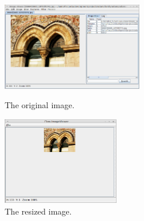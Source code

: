 \documentclass[a4paper]{book}
\begin{document}
\begin{figure}[htb]
  \begin{minipage}[b]{0.48\linewidth}
  \centering
  \includegraphics[height=3.8cm]{images/imagemagick-resize-original.png}
  \caption{The original image.}
  \label{imagemagick-resize-original}
  \end{minipage}%
  \begin{minipage}[b]{0.48\linewidth}
  \centering
  \includegraphics[height=3.8cm]{images/imagemagick-resize-output.png}
  \caption{The resized image.}
  \label{imagemagick-resize-output}
  \end{minipage}
\end{figure}


\end{document}
